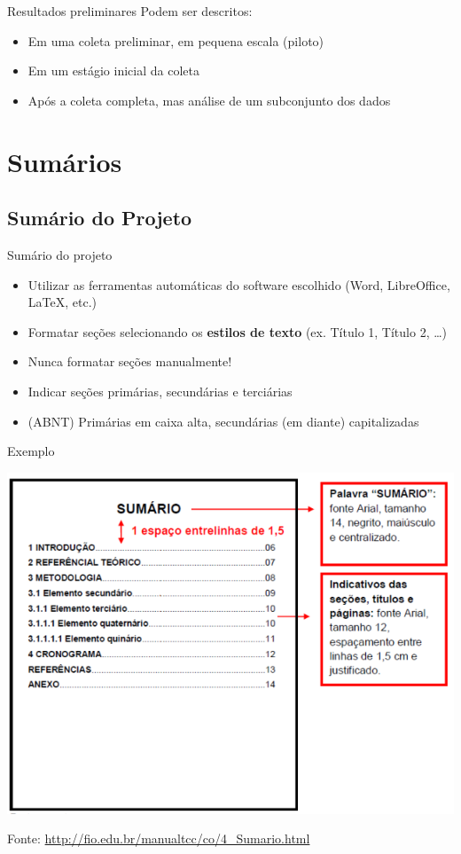 \documentclass{beamer}
\begin{document}
\begin{frame}{Resultados preliminares}
  Podem ser descritos:
  \begin{itemize}
  \item Em uma coleta preliminar, em pequena escala (piloto)
  \item Em um estágio inicial da coleta
  \item Após a coleta completa, mas análise de um subconjunto dos dados
  \end{itemize}
\end{frame}

\section{Sumários}

\subsection{Sumário do Projeto}

\begin{frame}{Sumário do projeto}
  \begin{itemize}
  \item Utilizar as ferramentas automáticas do software escolhido
    (Word, LibreOffice, \LaTeX, etc.)
  \item Formatar seções selecionando os {\bf estilos de texto}
    (ex. Título 1, Título 2, \ldots)
  \item \alert{Nunca} formatar seções manualmente!
  \item Indicar seções primárias, secundárias e terciárias
  \item (ABNT) Primárias em caixa alta, secundárias (em diante)
    capitalizadas
  \end{itemize}
\end{frame}

\begin{frame}{Exemplo}
  \begin{center}
    \includegraphics[height=0.8\textheight]{ProjetoII/sumario}
  \end{center}

  Fonte: \url{http://fio.edu.br/manualtcc/co/4_Sumario.html}
\end{frame}
\end{document}
